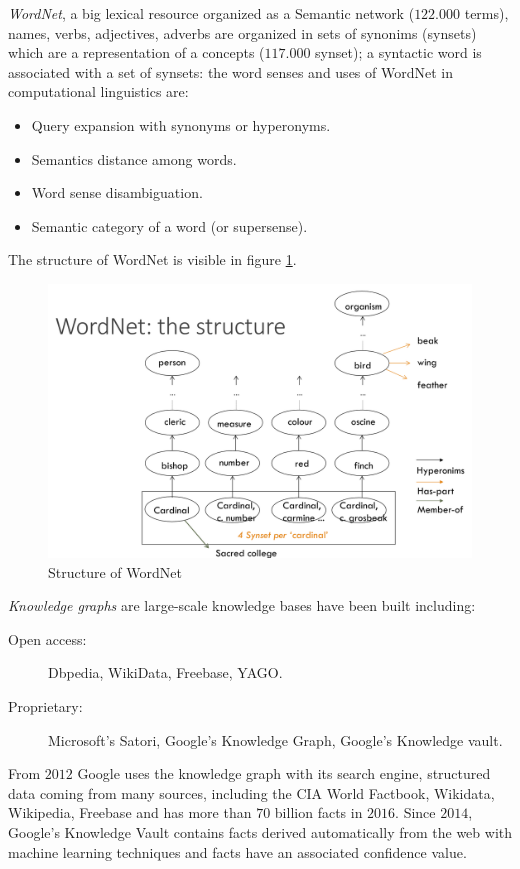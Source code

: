 \emph{WordNet}, a big lexical resource organized as a Semantic network ($122.000$ terms),
names, verbs, adjectives, adverbs are organized in sets of synonims (synsets) which
are a representation of a concepts ($117.000$ synset); a syntactic word is associated
with a set of synsets: the word senses and uses of WordNet in computational linguistics are:
\begin{itemize} 
   \item Query expansion with synonyms or hyperonyms.
   \item Semantics distance among words.
   \item Word sense disambiguation.
   \item Semantic category of a word (or supersense).
\end{itemize}
The structure of WordNet is visible in figure \ref{img:wordnet}.

\begin{figure}
	\includegraphics[width=\textwidth]{Images/wordnet}
	\caption{Structure of WordNet}
	\label{img:wordnet}
\end{figure}
\emph{Knowledge graphs} are large-scale knowledge bases have been built including:
\begin{description}
    \item [Open access: ] Dbpedia, WikiData, Freebase, YAGO.
    \item [Proprietary: ] Microsoft's Satori, Google's Knowledge Graph,
	                  Google’s Knowledge vault.
\end{description}
From $2012$ Google uses the knowledge graph with its search engine, structured data
coming from many sources, including the CIA World Factbook, Wikidata, Wikipedia, Freebase
and has more than $70$ billion facts in $2016$.\newline
Since $2014$, Google’s Knowledge Vault contains facts derived automatically from the
web with machine learning techniques and facts have an associated confidence value.

